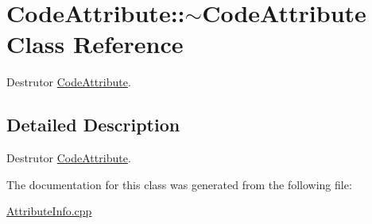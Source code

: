 \hypertarget{class_code_attribute_1_1~_code_attribute}{}\section{Code\+Attribute\+:\+:$\sim$\+Code\+Attribute Class Reference}
\label{class_code_attribute_1_1~_code_attribute}


Destrutor \hyperlink{class_code_attribute}{Code\+Attribute}.  




\subsection{Detailed Description}
Destrutor \hyperlink{class_code_attribute}{Code\+Attribute}. 

The documentation for this class was generated from the following file\+:\begin{DoxyCompactItemize}
\item 
\hyperlink{_attribute_info_8cpp}{Attribute\+Info.\+cpp}\end{DoxyCompactItemize}
